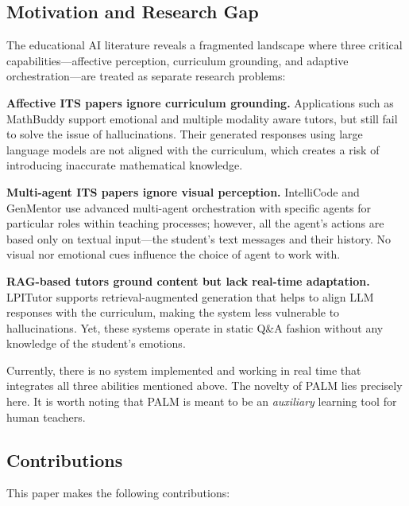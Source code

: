\documentclass[conference, letterpaper]{IEEEtran}
\begin{document}
\subsection{Motivation and Research Gap}

The educational AI literature reveals a fragmented landscape where three critical capabilities---affective perception, curriculum grounding, and adaptive orchestration---are treated as separate research problems:

\textbf{Affective ITS papers ignore curriculum grounding.} Applications such as MathBuddy \cite{mathbuddy2025} support emotional and multiple modality aware tutors, but still fail to solve the issue of hallucinations. Their generated responses using large language models are not aligned with the curriculum, which creates a risk of introducing inaccurate mathematical knowledge.

\textbf{Multi-agent ITS papers ignore visual perception.} IntelliCode \cite{intellicode2025} and GenMentor \cite{genmentor2025} use advanced multi-agent orchestration with specific agents for particular roles within teaching processes; however, all the agent's actions are based only on textual input—the student's text messages and their history. No visual nor emotional cues influence the choice of agent to work with.

\textbf{RAG-based tutors ground content but lack real-time adaptation.} LPITutor \cite{lpitutor2025} supports retrieval-augmented generation that helps to align LLM responses with the curriculum, making the system less vulnerable to hallucinations. Yet, these systems operate in static Q\&A fashion without any knowledge of the student's emotions.

Currently, there is no system implemented and working in real time that integrates all three abilities mentioned above. The novelty of PALM lies precisely here. It is worth noting that PALM is meant to be an \emph{auxiliary} learning tool for human teachers.

\subsection{Contributions}

This paper makes the following contributions:
\end{document}
